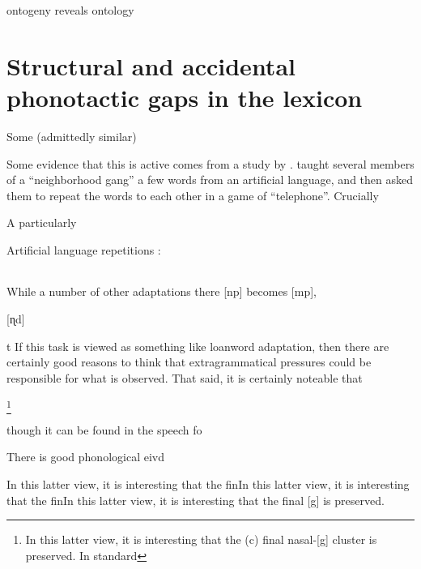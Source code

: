
ontogeny reveals ontology

\chapter{Structural and accidental phonotactic gaps in the lexicon}

Some (admittedly similar) 

Some evidence that this is active comes from a study by \citet[]{Wright1975}. \citeauthor{Wright1975} taught several members of a ``neighborhood gang'' a few words from an artificial language, and then asked them to repeat the words to each other in a game of ``telephone''. Crucially

A particularly 

\ex Artificial language repetitions \citep[from][]{Wright1975}: \\
\begin{tabular}{l l l l l l} %
\end{tabular} \xe

\noindent
While a number of other adaptations there 
[np] becomes [mp], 



[ɳd]

t
If this task is viewed as something like loanword adaptation, then there are certainly good reasons to think that extragrammatical pressures \citep{Dupoux1999,Ussishkin2003,Peperkamp2008} could be responsible for what is observed. That said, it is certainly noteable that 

\footnote{In this latter view, it is interesting that the (\lastx c) final nasal-[g] cluster is preserved. In standard }

\citep{Schleef2011}


though it can be found in the speech fo 

There is good phonological eivd

In this latter view, it is interesting that the finIn this latter view, it is interesting that the finIn this latter view, it is interesting that the final [g] is preserved.

